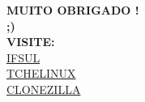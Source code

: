 \documentclass{beamer}
\begin{document}
\appendix

%    
%    

\begin{frame}[plain,c]
\vspace{2.5cm}
    \begin{center}
      \Huge \textbf{MUITO OBRIGADO !}\\
      \Huge \textbf{;)}\\  
      \medskip
      \medskip
      \medskip
      \medskip
      \medskip
      \small \textbf{VISITE:}\\
      \small \href{http://www.ifsul.edu.br}{IFSUL}\\
      \small\href{https://tchelinux.org/}{TCHELINUX}\\
      \small\href{https://clonezilla.org/}{CLONEZILLA}\\
    \end{center}
\end{frame}
\end{document}
